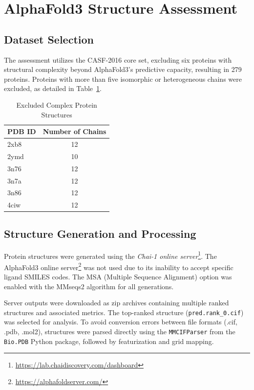 \documentclass[unnumsec,webpdf,contemporary,large]{oup-authoring-template}
\theoremstyle{thmstyleone}%
\theoremstyle{thmstyletwo}%
\theoremstyle{thmstylethree}%
\begin{document}
\section{AlphaFold3 Structure Assessment}

\subsection{Dataset Selection}
The assessment utilizes the CASF-2016 core set, excluding six proteins with structural complexity beyond AlphaFold3's predictive capacity, resulting in 279 proteins. Proteins with more than five isomorphic or heterogeneous chains were excluded, as detailed in Table~\ref{tab:complex}.

\begin{table}[H]
\centering
\caption{Excluded Complex Protein Structures}
\label{tab:complex}
\begin{tabular}{lc}
\toprule
PDB ID & Number of Chains \\
\midrule
2xb8 & 12 \\
2ymd & 10 \\
3n76 & 12 \\
3n7a & 12 \\
3n86 & 12 \\
4ciw & 12 \\
\bottomrule
\end{tabular}
\end{table}

\subsection{Structure Generation and Processing}
Protein structures were generated using the \textit{Chai-1 online server}\footnote{\url{https://lab.chaidiscovery.com/dashboard}}. The AlphaFold3 online server\footnote{\url{https://alphafoldserver.com/}} was not used due to its inability to accept specific ligand SMILES codes. The MSA (Multiple Sequence Alignment) option was enabled with the MMseqs2 algorithm for all generations.

Server outputs were downloaded as zip archives containing multiple ranked structures and associated metrics. The top-ranked structure (\texttt{pred.rank\_0.cif}) was selected for analysis. To avoid conversion errors between file formats (.cif, .pdb, .mol2), structures were parsed directly using the \texttt{MMCIFParser} from the \texttt{Bio.PDB} Python package, followed by featurization and grid mapping.
\end{document}
